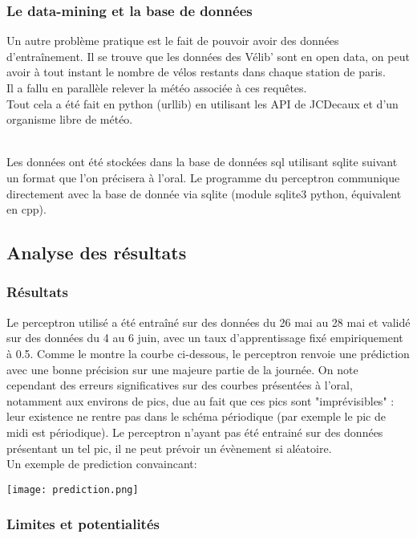 \documentclass[a4paper, 11pt]{article}
\begin{document}
	\subsubsection{Le data-mining et la base de données}

Un autre problème pratique est le fait de pouvoir avoir des données d'entraînement.
Il se trouve que les données des Vélib' sont en open data, on peut avoir à tout instant le nombre de vélos restants dans chaque station de paris.
\\Il a fallu en parallèle relever la météo associée à ces requêtes.
\\Tout cela a été fait en python (urllib) en utilisant les API de JCDecaux et d'un organisme libre de météo.

\\Les données ont été stockées dans la base de données sql utilisant sqlite suivant un format que l'on précisera à l'oral.
Le programme du perceptron communique directement avec la base de donnée via sqlite (module sqlite3 python, équivalent en cpp).

\subsection{Analyse des résultats}
	\subsubsection{Résultats}
	Le perceptron utilisé a été entraîné sur des données du 26 mai au 28 mai et validé sur des données du 4 au 6 juin, avec un taux d'apprentissage fixé empiriquement à 0.5.
	Comme le montre la courbe ci-dessous, le perceptron renvoie une prédiction avec une bonne précision sur une majeure partie de la journée. On note cependant des erreurs significatives sur des courbes présentées à l'oral, notamment aux environs de pics, due au fait que ces pics sont "imprévisibles" : leur existence ne rentre pas dans le schéma périodique (par exemple le pic de midi est périodique). Le perceptron n'ayant pas été entrainé sur des données présentant un tel pic, il ne peut prévoir un évènement si aléatoire.\\
	
	Un exemple de prediction  convaincant:
	\begin{center}
	\texttt{[image: prediction.png]}
	\end{center}
	\subsubsection{Limites et potentialités}
	
\end{document}
